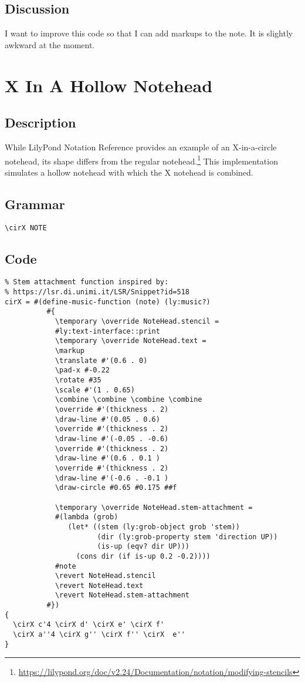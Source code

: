 \documentclass[11pt, oneside]{book}   	%
\begin{document}
\subsection{Discussion}
I want to improve this code so that I can add markups to the note. It is slightly awkward at the moment.
\clearpage



\section {X In A Hollow Notehead}
\hfill

\subsection{Description}
While LilyPond Notation Reference provides an example of an X-in-a-circle notehead, its shape differs from the regular notehead.\footnote{\url{https://lilypond.org/doc/v2.24/Documentation/notation/modifying-stencils}} This implementation simulates a hollow notehead with which the X notehead is combined.

\subsection{Grammar}
\begin{verbatim}
\cirX NOTE
\end{verbatim}
\subsection{Code}
\begin{verbatim}
% Stem attachment function inspired by:
% https://lsr.di.unimi.it/LSR/Snippet?id=518
cirX = #(define-music-function (note) (ly:music?)
          #{
            \temporary \override NoteHead.stencil =
            #ly:text-interface::print
            \temporary \override NoteHead.text =
            \markup
            \translate #'(0.6 . 0)
            \pad-x #-0.22
            \rotate #35
            \scale #'(1 . 0.65)
            \combine \combine \combine \combine
            \override #'(thickness . 2)
            \draw-line #'(0.05 . 0.6)
            \override #'(thickness . 2)
            \draw-line #'(-0.05 . -0.6)
            \override #'(thickness . 2)
            \draw-line #'(0.6 . 0.1 )
            \override #'(thickness . 2)
            \draw-line #'(-0.6 . -0.1 )
            \draw-circle #0.65 #0.175 ##f

            \temporary \override NoteHead.stem-attachment =
            #(lambda (grob)
               (let* ((stem (ly:grob-object grob 'stem))
                      (dir (ly:grob-property stem 'direction UP))
                      (is-up (eqv? dir UP)))
                 (cons dir (if is-up 0.2 -0.2))))
            #note
            \revert NoteHead.stencil
            \revert NoteHead.text
            \revert NoteHead.stem-attachment
          #})
{
  \cirX c'4 \cirX d' \cirX e' \cirX f'
  \cirX a''4 \cirX g'' \cirX f'' \cirX  e''
}
\end{verbatim}
\vfill \break
\end{document}
